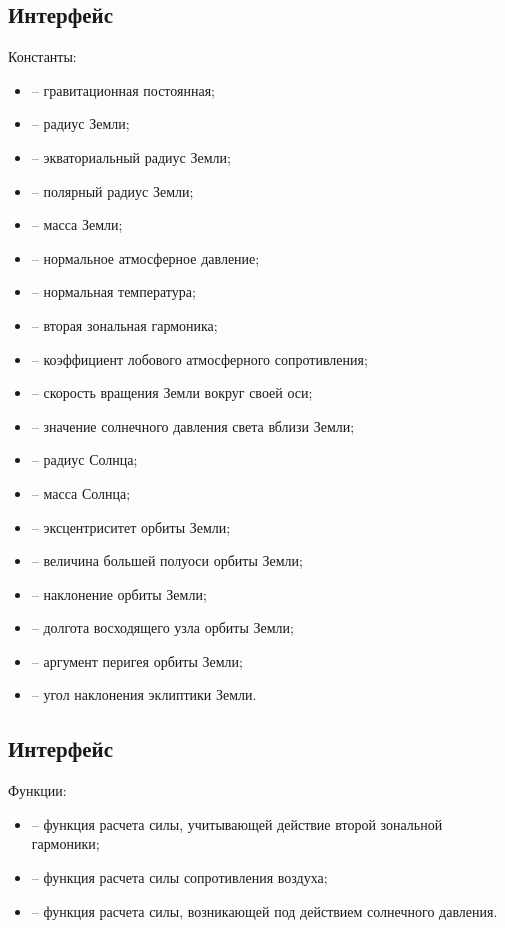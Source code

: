 \subsection{Интерфейс }
\noindent\indent Константы:
\begin{itemize}
    \item {} -- гравитационная постоянная;
    \item {} -- радиус Земли;
    \item {} -- экваториальный радиус Земли;
    \item {} -- полярный радиус Земли;
    \item {} -- масса Земли;
    \item {} -- нормальное атмосферное давление;
    \item {} -- нормальная температура;
    \item {} -- вторая зональная гармоника;
    \item {} -- коэффициент лобового атмосферного сопротивления;
    \item {} -- скорость вращения Земли вокруг своей оси;
    \item {} -- значение солнечного давления света вблизи Земли;
    \item {} -- радиус Солнца;
    \item {} -- масса Солнца;
    \item {} -- эксцентриситет орбиты Земли;
    \item {} -- величина большей полуоси орбиты Земли;
    \item {} -- наклонение орбиты Земли;
    \item {} -- долгота восходящего узла орбиты Земли;
    \item {} -- аргумент перигея орбиты Земли;
    \item {} -- угол наклонения эклиптики Земли.
\end{itemize}
\subsection{Интерфейс }
\noindent\indent Функции:
\begin{itemize}
    \item {} -- функция расчета силы, учитывающей действие второй зональной гармоники;
    \item {}
     -- функция расчета силы сопротивления воздуха;
    \item {} -- функция расчета силы, возникающей под действием солнечного давления.
\end{itemize}
